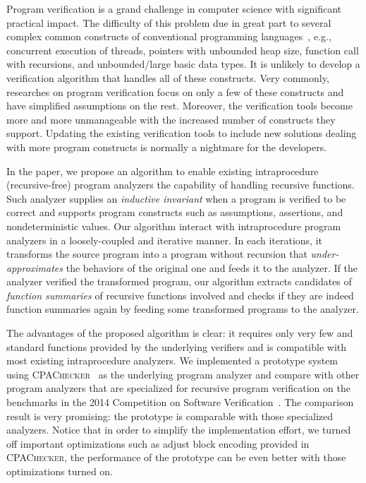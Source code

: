 Program verification is a grand challenge in computer science with significant practical impact. 
The difficulty of this problem due in great part to several complex common constructs of conventional programming languages~\cite{ClarkeJS05}, e.g., concurrent execution of threads, pointers with unbounded heap size, function call with recursions, and unbounded/large basic data types. It is unlikely to develop a verification algorithm that handles all of these constructs. Very commonly, researches on program verification focus on only a few of these constructs and have simplified assumptions on the rest. Moreover, the verification tools become more and more unmanageable with the increased number of constructs they support. Updating the existing verification tools to include new solutions dealing with more program constructs is normally a nightmare for the developers.

In the paper, we propose an algorithm to enable existing intraprocedure (recursive-free) program analyzers the capability of handling recursive functions. 
Such analyzer supplies an \emph{inductive invariant} when a program is verified to be correct and supports program constructs such as assumptions, assertions, and nondeterministic values. Our algorithm interact with intraprocedure program analyzers in a loosely-coupled and iterative manner. 
In each iterations, it transforms the source program into a program without recursion that \emph{under-approximates} the behaviors of the original one and feeds it to the analyzer.
If the analyzer verified the transformed program, our algorithm extracts candidates of \emph{function summaries} of recursive functions involved and checks if they are indeed function summaries again by feeding some transformed programs to the analyzer. 

The advantages of the proposed algorithm is clear: it requires only very few and standard functions provided by the underlying verifiers and is compatible with most existing intraprocedure analyzers. We implemented a prototype system using \textsc{CPAChecker}~\cite{BeyerK11} as the underlying program analyzer and compare
with other program analyzers that are specialized for recursive program verification on the benchmarks in the 2014 Competition on Software Verification~\cite{svcomp14}.
The comparison result is very promising: the prototype is comparable with those specialized analyzers. Notice that in order to simplify the implementation effort, we turned off important optimizations such as adjust block encoding provided in \textsc{CPAChecker}, the performance of the prototype can be even better with those optimizations turned on. 

